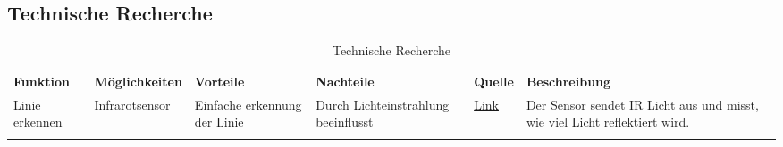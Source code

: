 \documentclass{article}
\begin{document}
\begin{landscape} %
	\section{Technische Recherche}
	\renewcommand*{\arraystretch}{1.8}
	\begin{longtable}{>{\raggedright\arraybackslash}m{3cm}>{\raggedright\arraybackslash}m{3cm}>{\raggedright\arraybackslash}m{5cm}>{\raggedright\arraybackslash}m{5cm}>{\raggedright\centering\arraybackslash}m{1cm}>{\raggedright\arraybackslash}m{7cm}}
		\caption{Technische Recherche} \\
				
				
		\textbf{Funktion}                & \textbf{Möglichkeiten}          & \textbf{Vorteile}                                                                                & \textbf{Nachteile}                                                                          & \textbf{Quelle}                                                                                                                             & \textbf{Beschreibung}                                                                                                                                                                                                                                                                                                                                                                                                                                                                     \\
		\hline
		Linie erkennen                   & Infrarotsensor                   & Einfache erkennung der Linie                                                                     & Durch Lichteinstrahlung beeinflusst                                                         & \href{https://www.futurelearn.com/info/courses/robotics-with-raspberry-pi/0/steps/75899}{Link}                                              & Der Sensor sendet IR Licht aus und misst, wie viel Licht reflektiert wird.                                                                                                                                                                                                                                                                                                                                                                                                                \\
		\cline{2-6}

\end{longtable}
\end{landscape}
\end{document}
